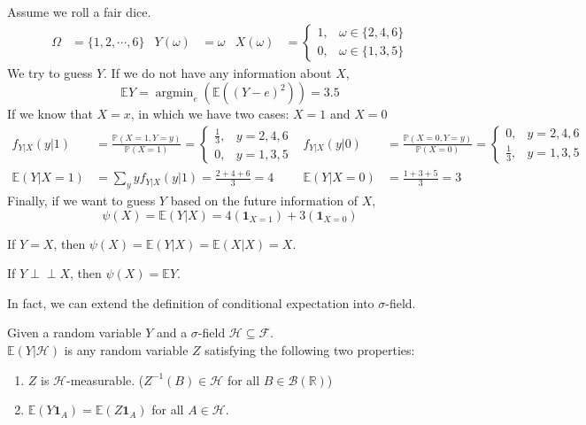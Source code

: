 \documentclass{huhtakm-template-book}
\newcommand{\independent}{\perp\!\!\!\perp}
\newcommand{\prob}{\mathbb{P}}
\newcommand{\expect}{\mathbb{E}}
\DeclareMathOperator*{\argmin}{argmin}
\begin{document}
    \begin{eg}
        Assume we roll a fair dice.
        \begin{align*}
            \Omega&=\{1,2,\cdots,6\} & Y(\omega)&=\omega & X(\omega)&=\begin{cases}
                1, &\omega\in\{2,4,6\}\\
                0, &\omega\in\{1,3,5\}
            \end{cases}
        \end{align*}
        We try to guess $Y$. If we do not have any information about $X$, 
        \begin{equation*}
            \expect Y=\argmin_{e}(\expect((Y-e)^{2}))=3.5
        \end{equation*}
        If we know that $X=x$, in which we have two cases: $X=1$ and $X=0$
        \begin{align*}
            f_{Y|X}(y|1)&=\frac{\prob(X=1,Y=y)}{\prob(X=1)}=\begin{cases}
                \frac{1}{3}, &y=2,4,6\\
                0, &y=1,3,5
            \end{cases} & f_{Y|X}(y|0)&=\frac{\prob(X=0,Y=y)}{\prob(X=0)}=\begin{cases}
                0, &y=2,4,6\\
                \frac{1}{3}, &y=1,3,5
            \end{cases}\\
            \expect(Y|X=1)&=\sum_{y}yf_{Y|X}(y|1)=\frac{2+4+6}{3}=4 & \expect(Y|X=0)&=\frac{1+3+5}{3}=3
        \end{align*}
        Finally, if we want to guess $Y$ based on the future information of $X$,
        \begin{equation*}
            \psi(X)=\expect(Y|X)=4(\mathbf{1}_{X=1})+3(\mathbf{1}_{X=0})
        \end{equation*}
    \end{eg}
    \begin{eg}
        If $Y=X$, then $\psi(X)=\expect(Y|X)=\expect(X|X)=X$.
    \end{eg}
    \begin{eg}
        If $Y\independent X$, then $\psi(X)=\expect Y$.
    \end{eg}
    In fact, we can extend the definition of conditional expectation into $\sigma$-field.
    \begin{defn}
        Given a random variable $Y$ and a $\sigma$-field $\mathcal{H}\subseteq\mathcal{F}$.\\
        $\expect(Y|\mathcal{H})$ is any random variable $Z$ satisfying the following two properties:
        \begin{enumerate}
            \item $Z$ is $\mathcal{H}$-measurable. ($Z^{-1}(B)\in\mathcal{H}$ for all $B\in\mathcal{B}(\mathbb{R})$)
            \item $\expect(Y\mathbf{1}_{A})=\expect(Z\mathbf{1}_{A})$ for all $A\in\mathcal{H}$.
        \end{enumerate}
    \end{defn}
\end{document}
